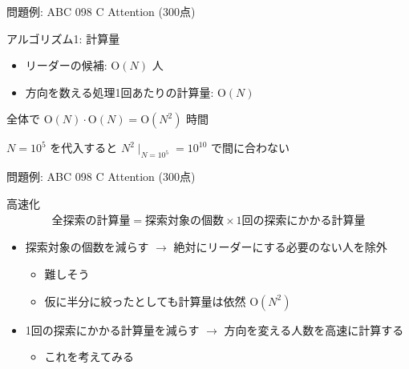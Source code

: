 \documentclass[dvipdfmx]{beamer}
\begin{document}
\begin{frame}{問題例: ABC 098 C Attention (300点)}
  \begin{block}{アルゴリズム1: 計算量}
    \begin{itemize}
      \item リーダーの候補: $\mathrm{O}(N)$ 人
      \item 方向を数える処理1回あたりの計算量: $\mathrm{O}(N)$
    \end{itemize}
    全体で $\mathrm{O}(N) \cdot \mathrm{O}(N) = \mathrm{O}(N^2)$ 時間

    $N=10^5$ を代入すると $N^2 \mid_{N=10^5} = 10^{10}$ で間に合わない
  \end{block}
\end{frame}

\begin{frame}{問題例: ABC 098 C Attention (300点)}
  \begin{block}{高速化}
    \begin{align*}
      \text{全探索の計算量} = \text{探索対象の個数} \times \text{1回の探索にかかる計算量}
    \end{align*}
    \begin{itemize}
      \item 探索対象の個数を減らす $\to$ 絶対にリーダーにする必要のない人を除外
      \begin{itemize}
        \item 難しそう
        \item 仮に半分に絞ったとしても計算量は依然 $\mathrm{O}(N^2)$
      \end{itemize}
      \item 1回の探索にかかる計算量を減らす $\to$ 方向を変える人数を高速に計算する
      \begin{itemize}
        \item これを考えてみる
      \end{itemize}
    \end{itemize}
  \end{block}
\end{frame}
\end{document}
